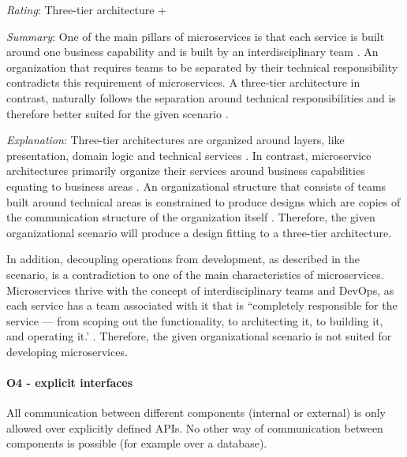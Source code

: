 \textit{Rating}: Three-tier architecture +

\textit{Summary}: One of the main pillars of microservices is that each service is built around one business capability and is built by an interdisciplinary team \cite{FowlerFowlerBusinessCap2014}. 
An organization that requires teams to be separated by their technical responsibility contradicts this requirement of microservices.
A three-tier architecture in contrast, naturally follows the separation around technical responsibilities and is therefore better suited for the given scenario \citep[p. 199f.]{Larman2004}.

\textit{Explanation}:
Three-tier architectures are organized around layers, like presentation, domain logic and technical services \citep[p. 199f.]{Larman2004} \cite{FowlerFowlerBusinessCap2014}.
In contrast, microservice architectures primarily organize their services around business capabilities equating to business areas \citep[p. 42]{Wolff2016}.
An organizational structure that consists of teams built around technical areas is constrained to produce designs which are copies of the communication structure of the organization itself \cite{Conway1968}.
Therefore, the given organizational scenario will produce a design fitting to a three-tier architecture.

In addition, decoupling operations from development, as described in the scenario, is a contradiction to one of the main characteristics of microservices.
Microservices thrive with the concept of interdisciplinary teams and DevOps, as each service has a team associated with it that is “completely responsible for the service — from scoping out the functionality, to architecting it, to building it, and operating it.’ \cite{Vogels2006}.
Therefore, the given organizational scenario is not suited for developing microservices.

\paragraph{O4 - explicit interfaces}
All communication between different components (internal or external) is only allowed over explicitly defined \ac{API}s. No other way of communication between components is possible (for example over a database).
\label{quaMicro:so4}

